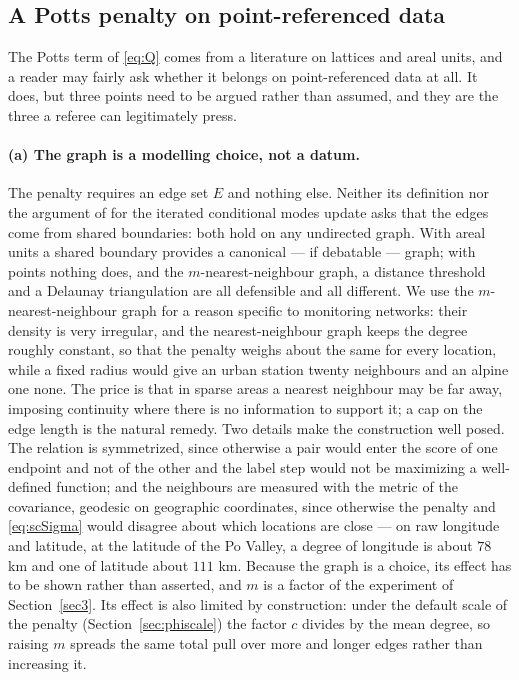 \subsection{A Potts penalty on point-referenced data}\label{sec2:potts}

The Potts term of \eqref{eq:Q} comes from a literature on lattices and areal units, and a reader may fairly ask whether it belongs on point-referenced data at all. It does, but three points need to be argued rather than assumed, and they are the three a referee can legitimately press.

\paragraph{(a) The graph is a modelling choice, not a datum.} The penalty requires an edge set $E$ and nothing else. Neither its definition nor the argument of \citet{Besag1986} for the iterated conditional modes update asks that the edges come from shared boundaries: both hold on any undirected graph. With areal units a shared boundary provides a canonical --- if debatable --- graph; with points nothing does, and the $m$-nearest-neighbour graph, a distance threshold and a Delaunay triangulation are all defensible and all different. We use the $m$-nearest-neighbour graph for a reason specific to monitoring networks: their density is very irregular, and the nearest-neighbour graph keeps the degree roughly constant, so that the penalty weighs about the same for every location, while a fixed radius would give an urban station twenty neighbours and an alpine one none. The price is that in sparse areas a nearest neighbour may be far away, imposing continuity where there is no information to support it; a cap on the edge length is the natural remedy. Two details make the construction well posed. The relation is symmetrized, since otherwise a pair would enter the score of one endpoint and not of the other and the label step would not be maximizing a well-defined function; and the neighbours are measured with the metric of the covariance, geodesic on geographic coordinates, since otherwise the penalty and \eqref{eq:scSigma} would disagree about which locations are close --- on raw longitude and latitude, at the latitude of the Po Valley, a degree of longitude is about $78$ km and one of latitude about $111$ km. Because the graph is a choice, its effect has to be shown rather than asserted, and $m$ is a factor of the experiment of Section~\ref{sec3}. Its effect is also limited by construction: under the default scale of the penalty (Section~\ref{sec:phiscale}) the factor $c$ divides by the mean degree, so raising $m$ spreads the same total pull over more and longer edges rather than increasing it.

